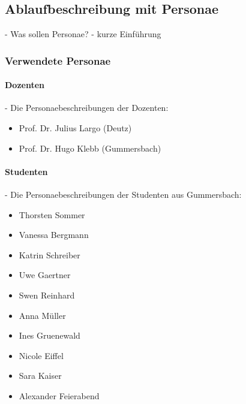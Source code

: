 
\subsection{Ablaufbeschreibung mit Personae} %
\label{sub:ablaufbeschreibung_mit_personae}

 - Was sollen Personae?
 - kurze Einführung
 
\subsubsection{Verwendete Personae} %
\label{ssub:verwendete_personae}

\paragraph{Dozenten} %
\label{par:dozenten}

  - Die Personaebeschreibungen der Dozenten:

\begin{itemize}

	\item Prof. Dr. Julius Largo (Deutz)
	\item Prof. Dr. Hugo Klebb (Gummersbach)

\end{itemize}



\paragraph{Studenten} %
\label{par:studenten}

  - Die Personaebeschreibungen der Studenten aus Gummersbach:

\begin{itemize}

	\item   Thorsten Sommer
	\item   Vanessa Bergmann
	\item   Katrin Schreiber
	\item   Uwe Gaertner
	\item   Swen Reinhard
	\item   Anna Müller
	\item   Ines Gruenewald
	\item   Nicole Eiffel
	\item   Sara Kaiser
	\item   Alexander Feierabend

\end{itemize}

